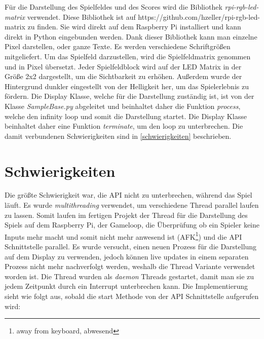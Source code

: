 \documentclass[a4paper,12pt]{scrartcl}
\begin{document}
Für die Darstellung des Spielfeldes und des Scores wird die Bibliothek \textit{rpi-rgb-led-matrix} verwendet. Diese Bibliothek ist auf https://github.com/hzeller/rpi-rgb-led-matrix zu finden. Sie wird direkt auf dem Raspberry Pi installiert und kann direkt in Python eingebunden werden. Dank dieser Bibliothek kann man einzelne Pixel darstellen, oder ganze Texte. Es werden verschiedene Schriftgrößen mitgeliefert. Um das Spielfeld darzustellen, wird die Spielfeldmatrix genommen und in Pixel übersetzt. Jeder Spielfeldblock wird auf der LED Matrix in der Größe 2x2 dargestellt, um die Sichtbarkeit zu erhöhen. Außerdem wurde der Hintergrund dunkler eingestellt von der Helligkeit her, um das Spielerlebnis zu fördern. Die Display Klasse, welche für die Darstellung zuständig ist, ist von der Klasse \textit{SampleBase.py} abgeleitet und beinhaltet daher die Funktion \textit{process}, welche den infinity loop und somit die Darstellung startet. Die Display Klasse beinhaltet daher eine Funktion \textit{terminate}, um den loop zu unterbrechen. Die damit verbundenen Schwierigkeiten sind in \autoref{schwierigkeiten} beschrieben.


\label{schwierigkeiten} %
\section{Schwierigkeiten}

Die größte Schwierigkeit war, die API nicht zu unterbrechen, während das Spiel läuft. Es wurde \textit{multithreading} verwendet, um verschiedene Thread parallel laufen zu lassen. Somit laufen im fertigen Projekt der Thread für die Darstellung des Spiels auf dem Raspberry Pi, der Gameloop, die Überprüfung ob ein Spieler keine Inputs mehr macht und somit nicht mehr anwesend ist (AFK\footnote{away from keyboard, abwesend}) und die API Schnittstelle parallel. Es wurde versucht, einen neuen Prozess für die Darstellung auf dem Display zu verwenden, jedoch können live updates in einem separaten Prozess nicht mehr nachverfolgt werden, weshalb die Thread Variante verwendet worden ist. Die Thread wurden als \textit{daemon} Threads gestartet, damit man sie zu jedem Zeitpunkt durch ein Interrupt unterbrechen kann. Die Implementierung sieht wie folgt aus, sobald die start Methode von der API Schnittstelle aufgerufen wird:
\end{document}
